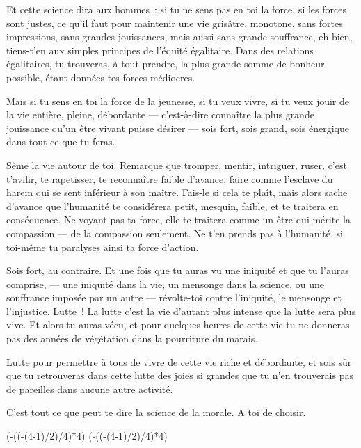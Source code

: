 \documentclass[french,twoside]{book} %
\def\truncdiv#1#2{((#1-(#2-1)/2)/#2)}
\def\moduloop#1#2{(#1-\truncdiv{#1}{#2}*#2)}
\def\modulo#1#2{\number\numexpr\moduloop{#1}{#2}\relax}
\begin{document}
Et cette science dira aux hommes : si tu ne sens pas en toi la force, si les forces sont justes, ce qu’il faut pour maintenir une vie grisâtre, monotone, sans fortes impressions, sans grandes jouissances, mais aussi sans grande souffrance, eh bien, tiens-t’en aux simples principes de l’équité égalitaire. Dans des relations égalitaires, tu trouveras, à tout prendre, la plus grande somme de bonheur possible, étant données tes forces médiocres.\par
Mais si tu sens en toi la force de la jeunesse, si tu veux vivre, si tu veux jouir de la vie entière, pleine, débordante — c’est-à-dire connaître la plus grande jouissance qu’un être vivant puisse désirer — sois fort, sois grand, sois énergique dans tout ce que tu feras.\par
Sème la vie autour de toi. Remarque que tromper, mentir, intriguer, ruser, c’est t’avilir, te rapetisser, te reconnaître faible d’avance, faire comme l’esclave du harem qui se sent inférieur à son maître. Fais-le si cela te plaît, mais alors sache d’avance que l’humanité te considérera petit, mesquin, faible, et te traitera en conséquence. Ne voyant pas ta force, elle te traitera comme un être qui mérite la compassion — de la compassion seulement. Ne t’en prends pas à l’humanité, si toi-même tu paralyses ainsi ta force d’action.\par
Sois fort, au contraire. Et une fois que tu auras vu une iniquité et que tu l’auras comprise, — une iniquité dans la vie, un mensonge dans la science, ou une souffrance imposée par un autre — révolte-toi contre l’iniquité, le mensonge et l’injustice. Lutte ! La lutte c’est la vie d’autant plus intense que la lutte sera plus vive. Et alors tu auras vécu, et pour quelques heures de cette vie tu ne donneras pas des années de végétation dans la pourriture du marais.\par
Lutte pour permettre à tous de vivre de cette vie riche et débordante, et sois sûr que tu retrouveras dans cette lutte des joies si grandes que tu n’en trouverais pas de pareilles dans aucune autre activité.\par
C’est tout ce que peut te dire la science de la morale. A toi de choisir.
 


\ifbooklet
  \pagestyle{empty}
  \clearpage
  \ifnum\modulo{\value{page}}{4}=0 \hbox{}\newpage\hbox{}\newpage\fi
  \ifnum\modulo{\value{page}}{4}=1 \hbox{}\newpage\hbox{}\newpage\fi
\end{document}
